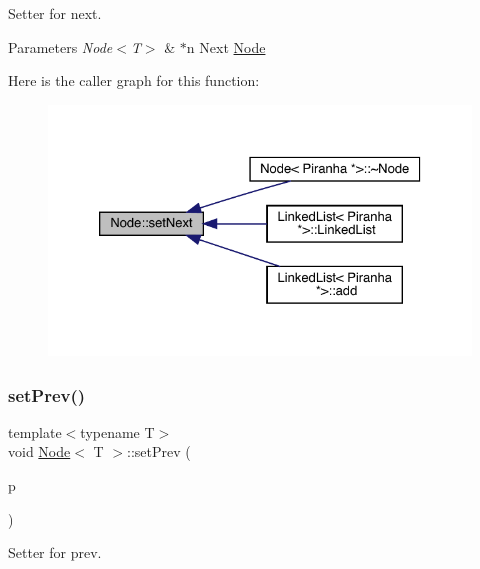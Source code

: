 Setter for next. 


\begin{DoxyParams}{Parameters}
{\em Node$<$\+T$>$} & $\ast$n Next \mbox{\hyperlink{class_node}{Node}} \\
\hline
\end{DoxyParams}
Here is the caller graph for this function\+:\nopagebreak
\begin{figure}[H]
\begin{center}
\leavevmode
\includegraphics[width=326pt]{class_node_a1ef90ff513d88f99b7a7c49d916ac6ea_icgraph}
\end{center}
\end{figure}
\mbox{\label{class_node_ac4a26ab24a7cfb8b9577d5b6d152a1dc}} 
\subsubsection{\texorpdfstring{set\+Prev()}{setPrev()}}
{\footnotesize\ttfamily template$<$typename T$>$ \\
void \mbox{\hyperlink{class_node}{Node}}$<$ T $>$\+::set\+Prev (\begin{DoxyParamCaption}\item[{\mbox{\hyperlink{class_node}{Node}}$<$ T $>$ $\ast$}]{p }\end{DoxyParamCaption})\hspace{0.3cm}{\ttfamily [inline]}}



Setter for prev. 


